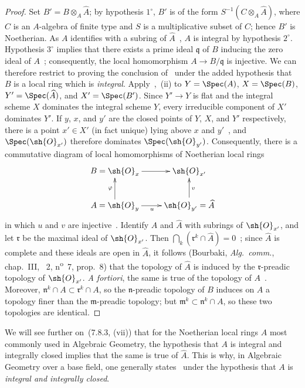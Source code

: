 \begin{proof}
Set $B'=B\otimes_A\widehat{A}$; by hypothesis $1^\circ$, $B'$ is of the form $S^{-1}(C\otimes_A\widehat{A})$, where $C$ is an $A$-algebra of finite type and $S$ is a multiplicative subset of $C$; hence $B'$ is Noetherian.
As $A$ identifies with a subring of $\widehat{A}$~, $A$ is integral by hypothesis $2^\circ$.
Hypothesis $3^\circ$ implies that there exists a prime ideal $\mathfrak{q}$ of $B$ inducing the zero ideal of $A$~; consequently, the local homomorphism $A\to B/\mathfrak{q}$ is injective.
We can therefore restrict to proving the conclusion of~ under the added hypothesis that $B$ is a local ring which is \emph{integral}.
Apply~,~(ii) to $Y=\Spec(A)$, $X=\Spec(B)$, $Y'=\Spec(\widehat{A})$, and $X'=\Spec(B')$.
Since $Y'\to Y$ is flat and the integral scheme $X$ dominates the integral scheme $Y$, every irreducible component of $X'$ dominates $Y'$.
If $y$, $x$, and $y'$ are the closed points of $Y$, $X$, and $Y'$ respectively, there is a point $x'\in X'$ (in fact unique) lying above $x$ and $y'$~, and $\Spec(\sh{O}_{x'})$ therefore dominates $\Spec(\sh{O}_{y'})$.
Consequently, there is a commutative diagram of local homomorphisms of Noetherian local rings
\[
\xymatrix{
  B=\sh{O}_x \ar[r] & \sh{O}_{x'}\\
  A=\sh{O}_y \ar[u]^{\varphi} \ar[r]_{u} & \sh{O}_{y'}=\widehat{A} \ar[u]_{v}
}
\]
in which $u$ and $v$ are injective~.
Identify $A$ and $\widehat{A}$ with subrings of $\sh{O}_{x'}$, and let $\mathfrak{r}$ be the maximal ideal of $\sh{O}_{x'}$.
Then $\bigcap_k(\mathfrak{r}^k\cap\widehat{A})=0$~; since $\widehat{A}$ is complete and these ideals are open in $\widehat{A}$, it follows (Bourbaki, \emph{Alg.~comm.}, chap.~III, \textsection~2, n\textsuperscript{o}~7, prop.~8) that the topology of $\widehat{A}$ is induced by the $\mathfrak{r}$-preadic topology of $\sh{O}_{x'}$.
\emph{A fortiori}, the same is true of the topology of $A$~.
Moreover, $\mathfrak{n}^k\cap A\subset\mathfrak{r}^k\cap A$, so the $\mathfrak{n}$-preadic topology of $B$ induces on $A$ a topology finer than the $\mathfrak{m}$-preadic topology; but $\mathfrak{m}^k\subset\mathfrak{n}^k\cap A$, so these two topologies are identical.
\end{proof}

\begin{remark}[2.3.9]
\label{IV.2.3.9}
We will see further on~(7.8.3, (vii)) that for the Noetherian local rings $A$ most commonly used in Algebraic Geometry, the hypothesis that $A$ is integral and integrally closed implies that the same is true of $\widehat{A}$.
This is why, in Algebraic Geometry over a base field, one generally states~ under the hypothesis that $A$ is \emph{integral and integrally closed}.
\end{remark}

